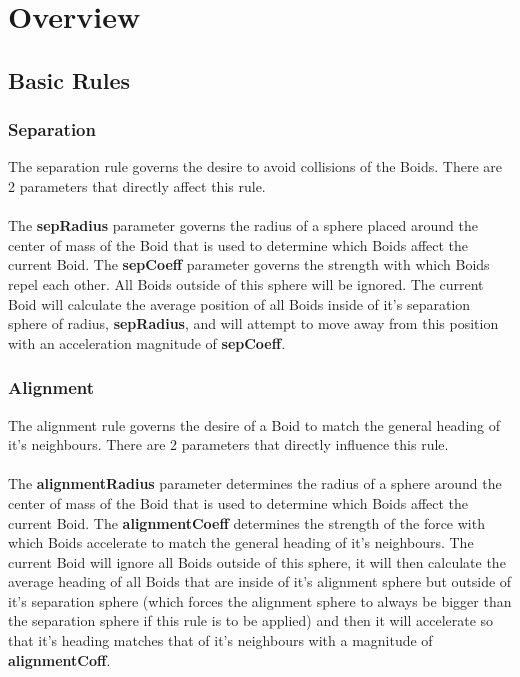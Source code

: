 \documentclass[12pt]{article}
\begin{document}
\section{Overview}
\subsection{Basic Rules}
\subsubsection{Separation}
The separation rule governs the desire to avoid collisions of the Boids. There are 2 parameters that directly affect this rule.
\\ \\
The \textbf{sepRadius} parameter governs the radius of a sphere placed around the center of mass of the Boid that is used to determine which Boids affect the current Boid. The \textbf{sepCoeff} parameter governs the strength with which Boids repel each other. All Boids outside of this sphere will be ignored. The current Boid will calculate the average position of all Boids inside of it's separation sphere of radius, \textbf{sepRadius}, and will attempt to move away from this position with an acceleration magnitude of \textbf{sepCoeff}.

\subsubsection{Alignment}
The alignment rule governs the desire of a Boid to match the general heading of it's neighbours. There are 2 parameters that directly influence this rule.
\\ \\
The \textbf{alignmentRadius} parameter determines the radius of a sphere around the center of mass of the Boid that is used to determine which Boids affect the current Boid. The \textbf{alignmentCoeff} determines the strength of the force with which Boids accelerate to match the general heading of it's neighbours. The current Boid will ignore all Boids outside of this sphere, it will then calculate the average heading of all Boids that are inside of it's alignment sphere but outside of it's separation sphere (which forces the alignment sphere to always be bigger than the separation sphere if this rule is to be applied) and then it will accelerate so that it's heading matches that of it's neighbours with a magnitude of \textbf{alignmentCoff}.
\end{document}
